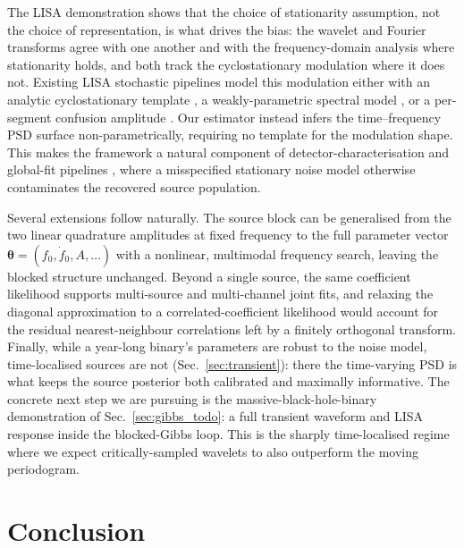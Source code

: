 \documentclass[
  aps,
  prd,
  twocolumn,
  amsmath,
  amssymb,
  nofootinbib,
  superscriptaddress,
  longbibliography,
]{revtex4-2}
\begin{document}
The LISA demonstration shows that the choice of stationarity assumption, not the
choice of representation, is what drives the bias: the wavelet and Fourier
transforms agree with one another and with the frequency-domain analysis where
stationarity holds, and both track the cyclostationary modulation where it does
not. Existing
LISA stochastic pipelines model this modulation either with an analytic
cyclostationary template \citep{digman2022cyclostationary, buscicchio2024test,
pozzoli2024bahamas}, a weakly-parametric spectral model
\citep{pozzoli2024weakly}, or a per-segment confusion amplitude
\citep{rosati2024prototype}. Our estimator instead infers the time--frequency
PSD surface non-parametrically, requiring no template for the modulation shape.
This makes the framework a natural component of detector-characterisation and
global-fit pipelines \citep{katz2025efficient}, where a misspecified stationary
noise model otherwise contaminates the recovered source population.

Several extensions follow naturally. The source block can be generalised from the
two linear quadrature amplitudes at fixed frequency to the full parameter vector
$\bm\theta = (f_0, \dot f_0, A, \ldots)$ with a nonlinear, multimodal frequency
search, leaving the blocked structure unchanged. Beyond a single source, the same
coefficient likelihood supports multi-source and multi-channel joint fits, and
relaxing the diagonal approximation to a correlated-coefficient likelihood would
account for the residual nearest-neighbour correlations left by a finitely
orthogonal transform. Finally, while a year-long binary's parameters are robust to
the noise model, time-localised sources are not (Sec.~\ref{sec:transient}): there
the time-varying PSD is what keeps the source posterior both calibrated and
maximally informative. The concrete next step we are pursuing is the
massive-black-hole-binary demonstration of Sec.~\ref{sec:gibbs_todo}: a full
transient waveform and LISA response inside the blocked-Gibbs loop. This is the
sharply time-localised regime where we expect critically-sampled wavelets to also
outperform the moving periodogram.

\section{Conclusion}
\label{sec:conclusion}
\end{document}
